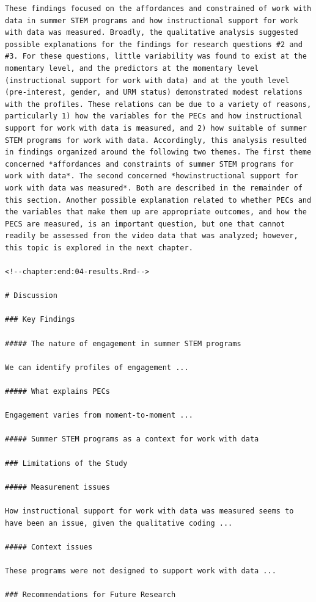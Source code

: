 \documentclass[]{book}
\theoremstyle{definition}
\theoremstyle{definition}
\theoremstyle{definition}
\theoremstyle{remark}
\begin{document}
\begin{verbatim}
These findings focused on the affordances and constrained of work with data in summer STEM programs and how instructional support for work with data was measured. Broadly, the qualitative analysis suggested possible explanations for the findings for research questions #2 and #3. For these questions, little variability was found to exist at the momentary level, and the predictors at the momentary level (instructional support for work with data) and at the youth level (pre-interest, gender, and URM status) demonstrated modest relations with the profiles. These relations can be due to a variety of reasons, particularly 1) how the variables for the PECs and how instructional support for work with data is measured, and 2) how suitable of summer STEM programs for work with data. Accordingly, this analysis resulted in findings organized around the following two themes. The first theme concerned *affordances and constraints of summer STEM programs for work with data*. The second concerned *howinstructional support for work with data was measured*. Both are described in the remainder of this section. Another possible explanation related to whether PECs and the variables that make them up are appropriate outcomes, and how the PECS are measured, is an important question, but one that cannot readily be assessed from the video data that was analyzed; however, this topic is explored in the next chapter.

<!--chapter:end:04-results.Rmd-->

# Discussion

### Key Findings

##### The nature of engagement in summer STEM programs

We can identify profiles of engagement ...

##### What explains PECs

Engagement varies from moment-to-moment ...

##### Summer STEM programs as a context for work with data

### Limitations of the Study

##### Measurement issues

How instructional support for work with data was measured seems to have been an issue, given the qualitative coding ...

##### Context issues

These programs were not designed to support work with data ...

### Recommendations for Future Research


\end{verbatim}
\end{document}
